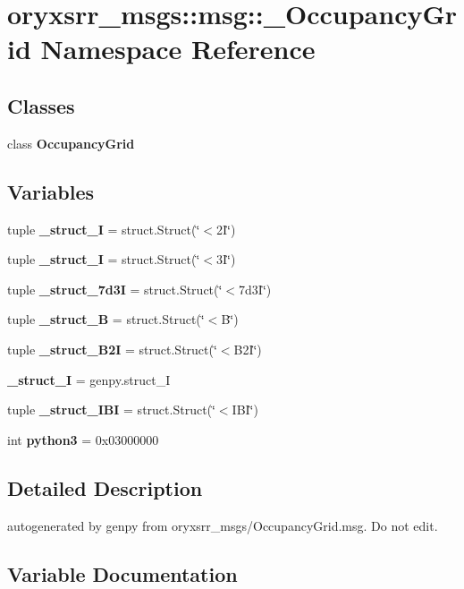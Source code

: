 \section{oryxsrr\-\_\-msgs\-:\-:msg\-:\-:\-\_\-\-Occupancy\-Grid \-Namespace \-Reference}
\label{namespaceoryxsrr__msgs_1_1msg_1_1__OccupancyGrid}
\subsection*{\-Classes}
\begin{DoxyCompactItemize}
\item 
class {\bf \-Occupancy\-Grid}
\end{DoxyCompactItemize}
\subsection*{\-Variables}
\begin{DoxyCompactItemize}
\item 
tuple {\bf \-\_\-struct\-\_\-I} = struct.\-Struct(\char`\"{}$<$2\-I\char`\"{})
\item 
tuple {\bf \-\_\-struct\-\_\-I} = struct.\-Struct(\char`\"{}$<$3\-I\char`\"{})
\item 
tuple {\bf \-\_\-struct\-\_\-7d3\-I} = struct.\-Struct(\char`\"{}$<$7d3\-I\char`\"{})
\item 
tuple {\bf \-\_\-struct\-\_\-\-B} = struct.\-Struct(\char`\"{}$<$\-B\char`\"{})
\item 
tuple {\bf \-\_\-struct\-\_\-\-B2\-I} = struct.\-Struct(\char`\"{}$<$\-B2\-I\char`\"{})
\item 
{\bf \-\_\-struct\-\_\-\-I} = genpy.\-struct\-\_\-\-I
\item 
tuple {\bf \-\_\-struct\-\_\-\-I\-B\-I} = struct.\-Struct(\char`\"{}$<$\-I\-B\-I\char`\"{})
\item 
int {\bf python3} = 0x03000000
\end{DoxyCompactItemize}


\subsection{\-Detailed \-Description}
\begin{DoxyVerb}autogenerated by genpy from oryxsrr_msgs/OccupancyGrid.msg. Do not edit.\end{DoxyVerb}
 

\subsection{\-Variable \-Documentation}
